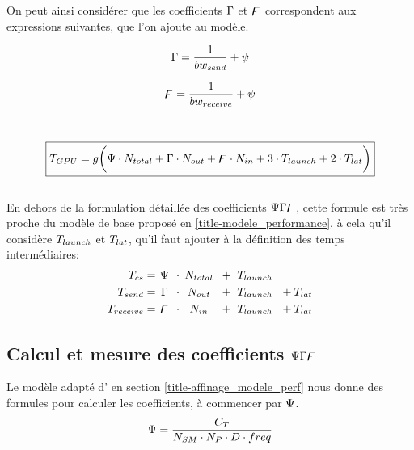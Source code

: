 On peut ainsi considérer que les coefficients $\Gamma$ et $\digamma$ correspondent aux expressions suivantes, que l'on ajoute au modèle.\\

\noindent\begin{minipage}{.5\linewidth}
	\begin{equation}
	\Gamma = \frac{1}{bw_{send}} + \psi
	\end{equation}
\end{minipage}%
\begin{minipage}{.5\linewidth}
	\begin{equation}
	\digamma = \frac{1}{bw_{receive}}  + \psi
	\end{equation}
\end{minipage}\\[\baselineskip]
\begin{equation}
\boxed{T_{GPU} = g \bigg( \Psi \cdot N_{total}  + \Gamma \cdot N_{out} + \digamma \cdot N_{in} + 3\cdot T_{launch} +2\cdot T_{lat} \bigg)}
\end{equation}\\[-\baselineskip]

En dehors de la formulation détaillée des coefficients $\Psi\Gamma\digamma$, cette formule est très proche du modèle de base proposé en \ref{title-modele_performance}, à cela qu'il considère $T_{launch}$ et $T_{lat}$, qu'il faut ajouter à la définition des temps intermédiaires:
\begin{align}
\Time_{cs}           &= \text{\makebox[10pt][c]{$\cscoef$} }\cdot  \text{\makebox[30pt][c]{$N_{total}$} } + \text{\makebox[38pt][c]{$ \Time_{launch}$} } \\
\Time_{send}      &=\text{\makebox[10pt][c]{$\scoef$} }   \cdot   \text{\makebox[30pt][c]{$N_{out}$} }   + \text{\makebox[38pt][c]{$ \Time_{launch}$} }+\Time_{lat} \\
\Time_{receive} &=  \text{\makebox[10pt][c]{$\rcoef$} } \cdot  \text{\makebox[30pt][c]{$N_{in}$} }       + \text{\makebox[38pt][c]{$ \Time_{launch}$} } +\Time_{lat}
\end{align}

\subsection{Calcul et mesure des coefficients $\Psi\Gamma\digamma$ } \label{title-calcul_coeff}
Le modèle adapté d'\citet{albuquerque_performance_2012} en section \ref{title-affinage_modele_perf} nous donne des formules pour calculer les coefficients, à commencer par $\Psi $.
\begin{equation*}
\Psi = \frac{C_T}{N_{SM}\cdot N_P \cdot D \cdot freq}
\end{equation*}\\[-\baselineskip]

